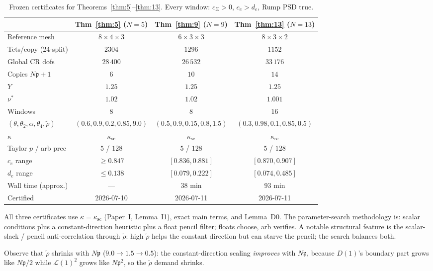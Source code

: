 \documentclass[11pt]{amsart}
\newcommand{\p}{\mathfrak{p}}
\begin{document}
\begin{table}[ht]
\centering
\small
\begin{tabular}{@{}lccc@{}}
\toprule
 & Thm~\ref{thm:5} ($N=5$)
 & Thm~\ref{thm:9} ($N=9$)
 & Thm~\ref{thm:13} ($N=13$) \\
\midrule
Reference mesh & $8\times 4\times 3$
  & $6\times 3\times 3$ & $8\times 3\times 2$ \\
Tets/copy (24-split) & $2304$ & $1296$ & $1152$ \\
Global CR dofs & $28\,400$ & $26\,532$ & $33\,176$ \\
Copies $N\p+1$ & $6$ & $10$ & $14$ \\
$Y$ & $1.25$ & $1.25$ & $1.25$ \\
$\nu^*$ & $1.02$ & $1.02$ & $1.001$ \\
Windows & $8$ & $8$ & $16$ \\
$(\theta,\theta_2,\alpha,\theta_4,\tilde\rho)$
  & $(0.6,0.9,0.2,0.85,9.0)$
  & $(0.5,0.9,0.15,0.8,1.5)$
  & $(0.3,0.98,0.1,0.85,0.5)$ \\
$\kappa$ & $\kappa_{\mathrm{sc}}$ & $\kappa_{\mathrm{sc}}$
  & $\kappa_{\mathrm{sc}}$ \\
Taylor $p$ / arb prec & $5$ / $128$ & $5$ / $128$ & $5$ / $128$ \\
$c_e$ range & $\ge 0.847$
  & $[0.836,0.881]$ & $[0.870,0.907]$ \\
$d_e$ range & $\le 0.138$
  & $[0.079,0.222]$ & $[0.074,0.485]$ \\
Wall time (approx.) & --- & $38$ min & $93$ min \\
Certified & 2026-07-10 & 2026-07-11 & 2026-07-11 \\
\bottomrule
\end{tabular}
\caption{Frozen certificates for Theorems~\ref{thm:5}--\ref{thm:13}.
Every window: $c_\Sigma>0$, $c_e>d_e$, Rump PSD true.}
\label{tab:certs}
\end{table}

All three certificates use $\kappa=\kappa_{\mathrm{sc}}$ (Paper~I,
Lemma~I1), exact main terms, and Lemma~D0.  The parameter-search
methodology is: scalar conditions plus a constant-direction heuristic
plus a float pencil filter; floats choose, arb verifies.  A notable
structural feature is the scalar-slack / pencil anti-correlation through
$\tilde\rho$: high $\tilde\rho$ helps the constant direction but can
starve the pencil; the search balances both.

Observe that $\tilde\rho$ shrinks with $N\p$ ($9.0\to 1.5\to 0.5$): the
constant-direction scaling \emph{improves} with $N\p$, because $D(1)$'s
boundary part grows like $N\p/2$ while $\mathcal{L}(1)^2$ grows like
$N\p^2$, so the $\tilde\rho$ demand shrinks.
\end{document}
